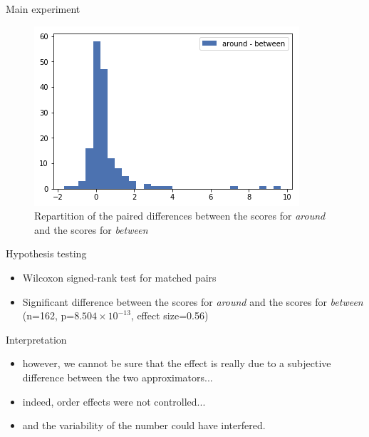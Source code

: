 \documentclass[xcolor=table, hyperref={pdfpagelabels=false}]{beamer}
\newcommand\SmallCaption[1]{%
	\captionsetup{font=scriptsize}%
	\caption{#1}}
\begin{document}
\begin{frame}{Main experiment}
\begin{minipage}{.4\textwidth}
	\begin{figure}
		\centering
		\includegraphics[width=\textwidth]{./images/main_exp_diff_dist.png}
		\SmallCaption{Repartition of the paired differences between the scores for \textit{around} and the scores for \textit{between}}
\end{figure}\pause
\end{minipage}\quad
\begin{minipage}{.55\textwidth}
	\begin{block}{Hypothesis testing}
	\begin{itemize}
		\item Wilcoxon signed-rank test for matched pairs
		\item Significant difference between the scores for \textit{around} and the scores for \textit{between} (n=162, p=$8.504 \times 10^{-13}$, effect size=0.56)
	\end{itemize}
\end{block}\pause
\end{minipage}
\begin{alertblock}{Interpretation}
	\begin{itemize}
		\item however, we cannot be sure that the effect is really due to a subjective difference between the two approximators...\pause
		\item indeed, order effects were not controlled... \pause
		\item and the variability of the number could have interfered.
	\end{itemize}
\end{alertblock}
\end{frame}
\end{document}
